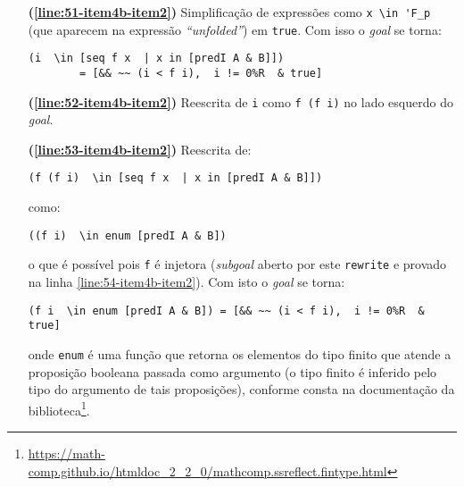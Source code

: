 \begin{enumerate}[label=\textbf{\roman*.}]
\begin{enumerate}[label=\textbf{\roman{enumi}.(\alph*)}]
\begin{enumerate}[label=\textbf{(\alph{enumii}.\arabic*)}]
\begin{enumerate}[listparindent=\parindent]
\begin{itemize}
                                                \item[\textbf{(\ref{line:51-item4b-item2})}] Simplificação de expressões como \lstinline[language=coq]|x \in 'F_p| (que aparecem na expressão \textit{``unfolded''}) em \lstinline[language=coq]|true|. Com isso o \textit{goal} se torna:
                                                        \begin{lstlisting}[language=coq,frame=single,tabsize=1]
(i  \in [seq f x  | x in [predI A & B]]) 
        = [&& ~~ (i < f i),  i != 0%R  & true]
                                                        \end{lstlisting}
                                                        
                                                \item[\textbf{(\ref{line:52-item4b-item2})}] Reescrita de \lstinline[language=coq]|i| como \lstinline[language=coq]|f (f i)| no lado esquerdo do \textit{goal}.
                                                
                                                \item[\textbf{(\ref{line:53-item4b-item2})}] Reescrita de:
                                                        \begin{lstlisting}[language=coq,frame=single,tabsize=1]
(f (f i)  \in [seq f x  | x in [predI A & B]])
                                                        \end{lstlisting}
                                                como:
                                                        \begin{lstlisting}[language=coq,frame=single,tabsize=1]
((f i)  \in enum [predI A & B])
                                                        \end{lstlisting}
                                                o que é possível pois \lstinline[language=coq]|f| é injetora (\textit{subgoal} aberto por este \lstinline[language=coq]|rewrite| e provado na linha \ref{line:54-item4b-item2}). Com isto o
                                                \textit{goal} se torna:
                                                        \begin{lstlisting}[language=coq,frame=single,tabsize=1]
(f i  \in enum [predI A & B]) = [&& ~~ (i < f i),  i != 0%R  & true]
                                                        \end{lstlisting}
                                                onde \lstinline[language=coq]|enum| é uma função que retorna os elementos do tipo finito que atende a proposição booleana passada como argumento (o tipo finito é inferido pelo tipo do argumento de tais proposições), conforme consta na documentação da biblioteca\footnote{\url{https://math-comp.github.io/htmldoc_2_2_0/mathcomp.ssreflect.fintype.html}}.


\end{itemize}
\end{enumerate}
\end{enumerate}
\end{enumerate}
\end{enumerate}
